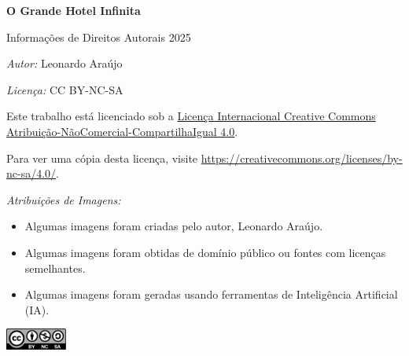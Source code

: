 \thispagestyle{empty} %

\vspace*{\fill} %

\begin{center}
    \textbf{\huge O Grande Hotel Infinita} %
    
    \large Informações de Direitos Autorais \textcopyright{} 2025 %
\end{center}

\vspace{1cm}

\begin{flushleft}
    \emph{Autor:} Leonardo Araújo
\end{flushleft}

\vspace{0.5cm}

\begin{flushleft}
    \emph{Licença:} CC BY-NC-SA


    Este trabalho está licenciado sob a \href{https://creativecommons.org/licenses/by-nc-sa/4.0/}{Licença Internacional Creative Commons Atribuição-NãoComercial-CompartilhaIgual 4.0}.

    Para ver uma cópia desta licença, visite \url{https://creativecommons.org/licenses/by-nc-sa/4.0/}.
\end{flushleft}

\vspace{0.5cm}

\begin{flushleft}
    \emph{Atribuições de Imagens:}

    \begin{itemize}
        \item Algumas imagens foram criadas pelo autor, Leonardo Araújo.
        \item Algumas imagens foram obtidas de domínio público ou fontes com licenças semelhantes.
        \item Algumas imagens foram geradas usando ferramentas de Inteligência Artificial (IA).
    \end{itemize}
\end{flushleft}

\vspace*{\fill} %
\begin{center}
\includegraphics[width=2cm]{cc-by-nc-sa.pdf}
\end{center}

\newpage
